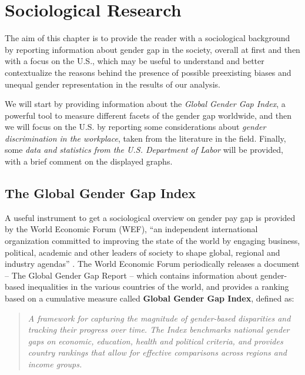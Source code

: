 \chapter{Sociological Research}
\label{chapter:sociological_research}
\thispagestyle{empty}

The aim of this chapter is to provide the reader with a sociological background by reporting information about gender gap in the society, overall at first and then with a focus on the U.S., which may be useful to understand and better contextualize the reasons behind the presence of possible preexisting biases and unequal gender representation in the results of our analysis.

We will start by providing information about the \textit{Global Gender Gap Index}, a powerful tool to measure different facets of the gender gap worldwide, and then we will focus on the U.S. by reporting some considerations about \textit{gender discrimination in the workplace}, taken from the literature in the field. Finally, some \textit{data and statistics from the U.S. Department of Labor} will be provided, with a brief comment on the displayed graphs.


\section{The Global Gender Gap Index}
A useful instrument to get a sociological overview on gender pay gap is provided by the World Economic Forum (WEF), ``an independent international organization committed to improving the state of the world by engaging business, political, academic and other leaders of society to shape global, regional and industry agendas'' \cite{world2021terms}. The World Economic Forum periodically releases a document -- The Global Gender Gap Report -- which contains information about gender-based inequalities in the various countries of the world, and provides a ranking based on a cumulative measure called \textbf{Global Gender Gap Index}, defined as:
\begin{quote}\emph{A framework for capturing the magnitude of gender-based disparities and tracking their progress over time. The Index benchmarks national gender gaps on economic, education, health and political criteria, and provides country rankings that allow for effective comparisons across regions and income groups.} \cite[p.~3]{schwab2017global}\end{quote}

